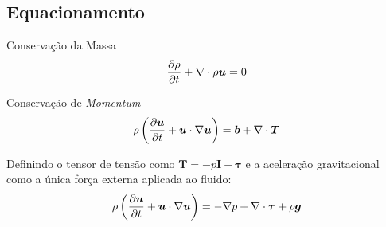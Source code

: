 \subsection{Equacionamento}
\begin{frame}
    \begin{exampleblock}{Conservação da Massa}
        \begin{equation}
            \frac{\partial \rho}{\partial t} + \nabla \cdot \rho \bm{u} = 0
        \end{equation}
    \end{exampleblock}

    \begin{exampleblock}{Conservação de \textit{Momentum}}
        \begin{equation}
            \rho \left( \frac{\partial \bm{u}}{\partial t}  + \bm{u} \cdot \nabla \bm{u} \right) =
            \bm{b} + \nabla \cdot \bm{T}
        \end{equation}
    \end{exampleblock}

    \hspace{0.5cm} Definindo o tensor de tensão como $\bm{T} = -p\bm{I} + \bm{\tau}$ e a 
    aceleração gravitacional como a única força externa aplicada ao fluido:
        \vspace{0.25cm}
        \begin{equation}
            \rho \left( \frac{\partial \bm{u}}{\partial t}  + \bm{u} \cdot \nabla \bm{u} \right) =
            -\nabla p + \nabla \cdot \bm{\tau} + \rho \bm{g}
        \end{equation}
\end{frame}


